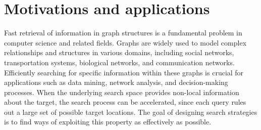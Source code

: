 \section{Motivations and applications}

Fast retrieval of information in graph structures is a fundamental problem in computer science and related fields. Graphs are widely used to model complex relationships and structures in various domains, including social networks, transportation systems, biological networks, and communication networks. Efficiently searching for specific information within these graphs is crucial for applications such as data mining, network analysis, and decision-making processes.
When the underlying search space provides non-local information about the target, 
the search process can be accelerated, since each query rules out a large set of 
possible target locations. The goal of designing search strategies is to find ways of exploiting this property as effectively as possible. 

